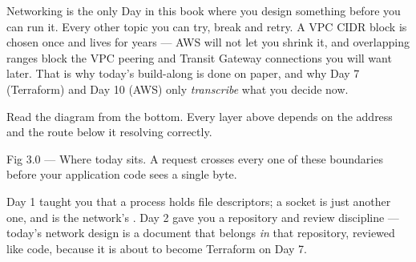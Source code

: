 \begin{keyidea}
Networking is the only Day in this book where you design something before you can run it. Every other topic you can try, break and retry. A VPC CIDR block is chosen once and lives for years --- AWS will not let you shrink it, and overlapping ranges block the VPC peering and Transit Gateway connections you will want later. That is why today's build-along is done on paper, and why Day 7 (Terraform) and Day 10 (AWS) only \emph{transcribe} what you decide now.
\end{keyidea}

 Read the diagram from the bottom. Every layer above depends on the address and the route below it resolving correctly.

\begin{wbfigure}{Fig 3.0 — Where today sits. A request crosses every one of these boundaries before your application code sees a single byte.}
\end{wbfigure}

 Day 1 taught you that a process holds file descriptors; a socket is just another one, and  is the network's . Day 2 gave you a repository and review discipline --- today's network design is a document that belongs \emph{in} that repository, reviewed like code, because it is about to become Terraform on Day 7.

